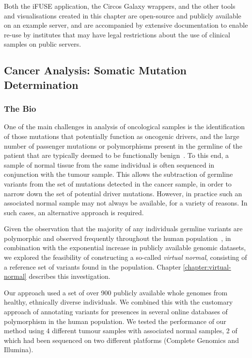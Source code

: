 Both the iFUSE application, the Circos Galaxy wrappers, and the other tools and visualisations created in this chapter are open-source and publicly available on an example server, and are accompanied by extensive documentation to enable re-use by institutes that may have legal restrictions about the use of clinical samples on public servers.

\subsection{Cancer Analysis: Somatic Mutation Determination}
\subsubsection{The Bio}
One of the main challenges in analysis of oncological samples is the identification of those mutations that potentially function as oncogenic drivers, and the large number of passenger mutations or polymorphisms present in the germline of the patient that are typically deemed to be functionally benign~\cite{lawrence2013mutational}. To this end, a sample of normal tissue from the same individual is often sequenced in conjunction with the tumour sample. This allows the subtraction of germline variants from the set of mutations detected in the cancer sample, in order to narrow down the set of potential driver mutations. However, in practice such an associated normal sample may not always be available, for a variety of reasons. In such cases, an alternative approach is required.

Given the observation that the majority of any individuals germline variants are polymorphic and observed frequently throughout the human population~\cite{10002010map,10002012integrated}, in combination with the exponential increase in publicly available genomic datasets, we explored the feasibility of constructing a so-called \emph{virtual normal}, consisting of a reference set of variants found in the population. Chapter \ref{chapter:virtual-normal} describes this investigation.

Our approach used a set of over 900 publicly available whole genomes from healthy, ethnically diverse individuals. We combined this with the customary approach of annotating variants for presences in several online databases of polymorphism in the human population. We tested the performance of our method using 4 different tumour samples with associated normal samples, 2 of which had been sequenced on two different platforms (Complete Genomics and Illumina).

